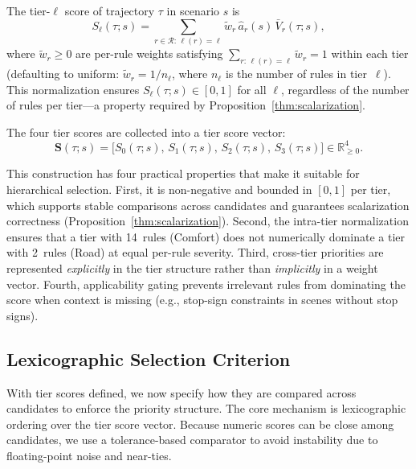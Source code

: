 \begin{definition}
\label{def:tier_score}
The tier-$\ell$ score of trajectory $\tau$ in scenario $s$ is
\begin{equation}
S_\ell(\tau;s)=\sum_{r \in \mathcal{R}:\,\ell(r)=\ell} \tilde{w}_r\,\hat{a}_r(s)\,\bar{V}_r(\tau;s),
\end{equation}
where $\tilde{w}_r \geq 0$ are per-rule weights satisfying $\sum_{r:\,\ell(r)=\ell}\tilde{w}_r = 1$ within each tier (defaulting to uniform: $\tilde{w}_r = 1/n_\ell$, where $n_\ell$ is the number of rules in tier~$\ell$).  This normalization ensures $S_\ell(\tau;s)\in[0,1]$ for all $\ell$, regardless of the number of rules per tier---a property required by Proposition~\ref{thm:scalarization}.
\end{definition}

\noindent
The four tier scores are collected into a tier score vector:
\begin{equation}
\mathbf{S}(\tau;s)=\big[S_0(\tau;s),\,S_1(\tau;s),\,S_2(\tau;s),\,S_3(\tau;s)\big]\in\mathbb{R}_{\ge 0}^{4}.
\end{equation}

This construction has four practical properties that make it suitable for hierarchical selection.  First, it is non-negative and bounded in $[0,1]$ per tier, which supports stable comparisons across candidates and guarantees scalarization correctness (Proposition~\ref{thm:scalarization}). Second, the intra-tier normalization ensures that a tier with 14~rules (Comfort) does not numerically dominate a tier with 2~rules (Road) at equal per-rule severity.  Third, cross-tier priorities are represented \emph{explicitly} in the tier structure rather than \emph{implicitly} in a weight vector.  Fourth, applicability gating prevents irrelevant rules from dominating the score when context is missing (e.g., stop-sign constraints in scenes without stop signs).

\subsection{Lexicographic Selection Criterion}
\label{subsec:lexicographic_selection}

With tier scores defined, we now specify how they are compared across candidates to enforce the priority structure.  The core mechanism is lexicographic ordering over the tier score vector.  Because numeric scores can be close among candidates, we use a tolerance-based comparator to avoid instability due to floating-point noise and near-ties.

